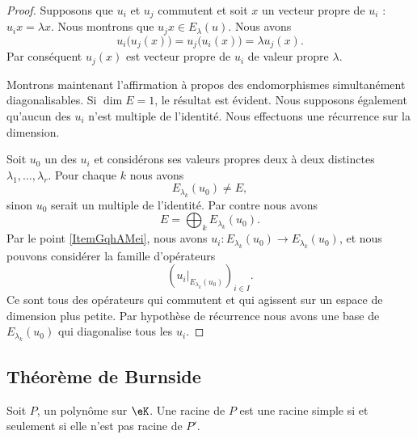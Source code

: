 \begin{proof}

    Supposons que \( u_i\) et \( u_j\) commutent et soit \( x\) un vecteur propre de \( u_i\) : \( u_ix=\lambda x\). Nous montrons que \( u_jx\in E_{\lambda}(u)\). Nous avons
    \begin{equation}
        u_i\big( u_j(x) \big)=u_j\big( u_i(x) \big)=\lambda u_j(x).
    \end{equation}
    Par conséquent \( u_j(x)\) est vecteur propre de \( u_i\) de valeur propre \( \lambda\).

    Montrons maintenant l'affirmation à propos des endomorphismes simultanément diagonalisables. Si \( \dim E=1\), le résultat est évident. Nous supposons également qu'aucun des \( u_i\) n'est multiple de l'identité. Nous effectuons une récurrence sur la dimension.

    Soit \( u_0\) un des \( u_i\) et considérons ses valeurs propres deux à deux distinctes \( \lambda_1,\ldots, \lambda_r\). Pour chaque \( k\) nous avons
    \begin{equation}
        E_{\lambda_k}(u_0)\neq E,
    \end{equation}
    sinon \( u_0\) serait un multiple de l'identité. Par contre nous avons
    \begin{equation}
        E=\bigoplus_{k}E_{\lambda_k}(u_0).
    \end{equation}
    Par le point \ref{ItemGqhAMei}, nous avons \( u_i\colon E_{\lambda_k}(u_0)\to E_{\lambda_k}(u_0)\), et nous pouvons considérer la famille d'opérateurs
    \begin{equation}
        \left( u_i|_{E_{\lambda_k}(u_0)} \right)_{i\in I}.
    \end{equation}
    Ce sont tous des opérateurs qui commutent et qui agissent sur un espace de dimension plus petite. Par hypothèse de récurrence nous avons une base de \( E_{\lambda_k}(u_0)\) qui diagonalise tous les \( u_i\).
\end{proof}

\subsection{Théorème de Burnside}

\begin{lemma}       \label{LemwXXzIt}
    Soit \( P\), un polynôme sur \( \eK\). Une racine de \( P\) est une racine simple si et seulement si elle n'est pas racine de \( P'\).
\end{lemma}


